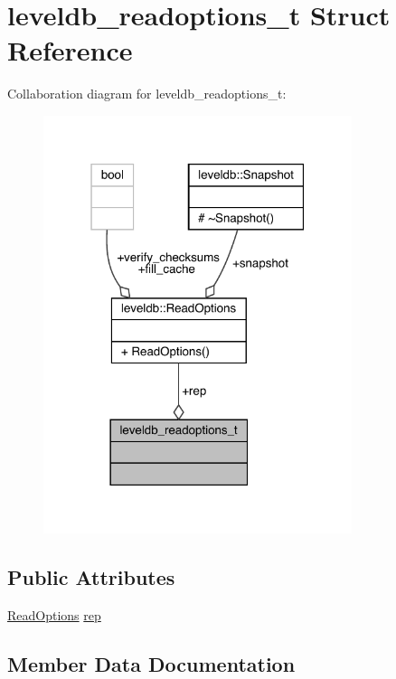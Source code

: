 \hypertarget{structleveldb__readoptions__t}{}\section{leveldb\+\_\+readoptions\+\_\+t Struct Reference}
\label{structleveldb__readoptions__t}


Collaboration diagram for leveldb\+\_\+readoptions\+\_\+t\+:
\nopagebreak
\begin{figure}[H]
\begin{center}
\leavevmode
\includegraphics[width=256pt]{structleveldb__readoptions__t__coll__graph}
\end{center}
\end{figure}
\subsection*{Public Attributes}
\begin{DoxyCompactItemize}
\item 
\mbox{\hyperlink{structleveldb_1_1_read_options}{Read\+Options}} \mbox{\hyperlink{structleveldb__readoptions__t_ad4bc0f881cf2c7a859642cd878dd568c}{rep}}
\end{DoxyCompactItemize}


\subsection{Member Data Documentation}
\mbox{\label{structleveldb__readoptions__t_ad4bc0f881cf2c7a859642cd878dd568c}} 
